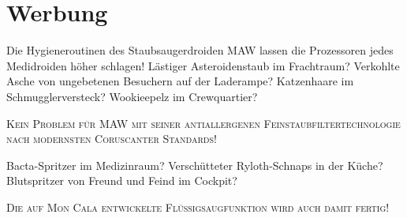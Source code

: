 \documentclass[final]{multiversum}
\begin{document}
\section{Werbung}


Die Hygieneroutinen des Staubsaugerdroiden MAW lassen die Prozessoren jedes Medidroiden höher schlagen!
Lästiger Asteroidenstaub im Frachtraum?
Verkohlte Asche von ungebetenen Besuchern auf der Laderampe?
Katzenhaare im Schmugglerversteck? Wookieepelz im Crewquartier?\\
\begin{center}\textsc{Kein Problem für MAW mit seiner antiallergenen Feinstaubfiltertechnologie nach modernsten Coruscanter Standards!}\\\end{center}
Bacta-Spritzer im Medizinraum?
Verschütteter Ryloth-Schnaps in der Küche?
Blutspritzer von Freund und Feind im Cockpit?\\
\begin{center}\textsc{Die auf Mon Cala entwickelte Flüssigsaugfunktion wird auch damit fertig!}\\\end{center}
\end{document}
